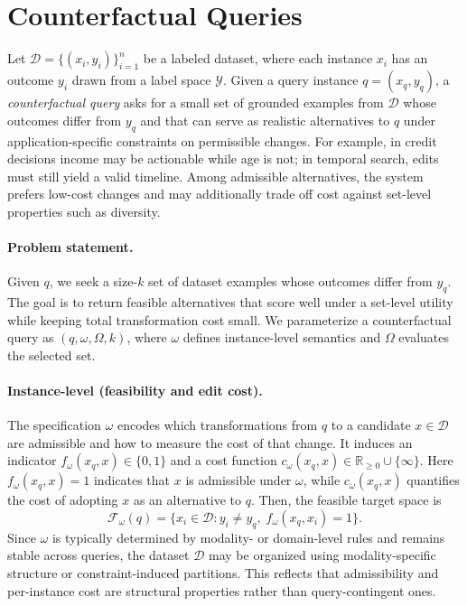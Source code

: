 \section{Counterfactual Queries}

Let $\mathcal D=\{(x_i,y_i)\}_{i=1}^n$ be a labeled dataset, where each instance $x_i$ has an outcome $y_i$ drawn from a label space $\mathcal Y$. Given a query instance $q=(x_q,y_q)$, a \emph{counterfactual query} asks for a small set of grounded examples from $\mathcal D$ whose outcomes differ from $y_q$ and that can serve as realistic alternatives to $q$ under application-specific constraints on permissible changes. For example, in credit decisions income may be actionable while age is not; in temporal search, edits must still yield a valid timeline. Among admissible alternatives, the system prefers low-cost changes and may additionally trade off cost against set-level properties such as diversity.


\paragraph{Problem statement.}
Given $q$, we seek a size-$k$ set of dataset examples whose outcomes differ from $y_q$. The goal is to return feasible alternatives that score well under a set-level utility while keeping total transformation cost small. We parameterize a counterfactual query as $(q,\omega,\Omega,k)$, where $\omega$ defines instance-level semantics and $\Omega$ evaluates the selected set.

\paragraph{Instance-level (feasibility and edit cost).}
The specification $\omega$ encodes which transformations from $q$ to a candidate $x\in\mathcal D$ are admissible and how to measure the cost of that change. It induces an indicator  $f_\omega(x_q,x)\in\{0,1\}$ and a cost function
$c_\omega(x_q,x)\in\mathbb R_{\ge0}\cup\{\infty\}$. Here $f_\omega(x_q,x)=1$ indicates that $x$ is admissible under $\omega$, while $c_\omega(x_q,x)$ quantifies the cost of adopting $x$ as an alternative to $q$. Then, the feasible target space is
\begingroup\small
\begin{equation}
\mathcal F_\omega(q)
=
\{x_i\in\mathcal D : y_i\neq y_q,\; f_\omega(x_q,x_i)=1\}.
\label{eq:feasible}
\end{equation}
\endgroup
Since $\omega$ is typically determined by modality- or domain-level rules and remains stable across queries, the dataset $\mathcal D$ may be organized using modality-specific structure or constraint-induced partitions. This reflects that admissibility and per-instance cost are structural properties rather than query-contingent ones.

